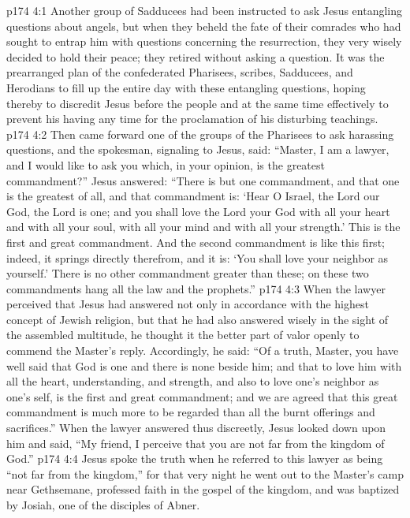 \vs p174 4:1 Another group of Sadducees had been instructed to ask Jesus entangling questions about angels, but when they beheld the fate of their comrades who had sought to entrap him with questions concerning the resurrection, they very wisely decided to hold their peace; they retired without asking a question. It was the prearranged plan of the confederated Pharisees, scribes, Sadducees, and Herodians to fill up the entire day with these entangling questions, hoping thereby to discredit Jesus before the people and at the same time effectively to prevent his having any time for the proclamation of his disturbing teachings.
\vs p174 4:2 Then came forward one of the groups of the Pharisees to ask harassing questions, and the spokesman, signaling to Jesus, said: “Master, I am a lawyer, and I would like to ask you which, in your opinion, is the greatest commandment?” Jesus answered: \textcolor{ubdarkred}{“There is but one commandment, and that one is the greatest of all, and that commandment is: ‘Hear O Israel, the Lord our God, the Lord is one; and you shall love the Lord your God with all your heart and with all your soul, with all your mind and with all your strength.’ This is the first and great commandment. And the second commandment is like this first; indeed, it springs directly therefrom, and it is: ‘You shall love your neighbor as yourself.’ There is no other commandment greater than these; on these two commandments hang all the law and the prophets.”}
\vs p174 4:3 When the lawyer perceived that Jesus had answered not only in accordance with the highest concept of Jewish religion, but that he had also answered wisely in the sight of the assembled multitude, he thought it the better part of valor openly to commend the Master’s reply. Accordingly, he said: “Of a truth, Master, you have well said that God is one and there is none beside him; and that to love him with all the heart, understanding, and strength, and also to love one’s neighbor as one’s self, is the first and great commandment; and we are agreed that this great commandment is much more to be regarded than all the burnt offerings and sacrifices.” When the lawyer answered thus discreetly, Jesus looked down upon him and said, \textcolor{ubdarkred}{“My friend, I perceive that you are not far from the kingdom of God.”}
\vs p174 4:4 \pc Jesus spoke the truth when he referred to this lawyer as being \textcolor{ubdarkred}{“not far from the kingdom,”} for that very night he went out to the Master’s camp near Gethsemane, professed faith in the gospel of the kingdom, and was baptized by Josiah, one of the disciples of Abner.
